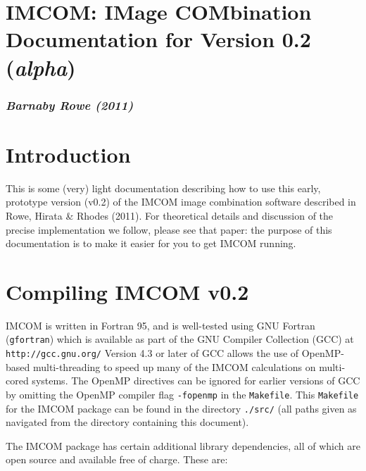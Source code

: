 \documentclass[10pt]{article}
\begin{document}
\setlength{\parskip}{2.0ex plus 0.5ex minus 0.5ex}
\setlength{\parindent}{0cm} 

\section*{IMCOM: IMage COMbination \\ Documentation for Version 0.2 (\emph{alpha})}
\subsubsection*{\emph{Barnaby Rowe (2011)}}

\section{Introduction}
This is some (very) light documentation describing how to use this early, prototype version (v0.2) of the IMCOM image combination software described in Rowe, Hirata \& Rhodes (2011).  For theoretical details and discussion of the precise implementation we follow, please see that paper: the purpose of this documentation is to make it easier for you to get IMCOM running.

\section{Compiling IMCOM v0.2}
IMCOM is written in Fortran 95, and is well-tested using GNU Fortran (\texttt{gfortran}) which is available as part of the GNU Compiler Collection (GCC) at \newline
\texttt{http://gcc.gnu.org/} \newline
Version 4.3 or later of GCC allows the use of OpenMP-based multi-threading to speed up many of the IMCOM calculations on multi-cored systems.  The OpenMP directives can be ignored for earlier versions of GCC by omitting the OpenMP compiler flag \texttt{-fopenmp} in the \texttt{Makefile}.  This \texttt{Makefile} for the IMCOM package can be found in the directory \texttt{./src/} (all paths given as navigated from the directory containing this document).

The IMCOM package has certain additional library dependencies, all of which are open source and available free of charge.  These are:
\end{document}
